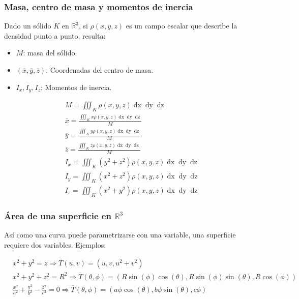\documentclass{article}
\renewcommand{\Bbb}{\mathbb}
\begin{document}
\subsubsection{Masa, centro de masa y momentos de inercia}

Dado un sólido $K$ en $\Bbb R^3$, si $\rho(x,y,z)$ es un campo escalar que describe la densidad punto a punto, resulta:

\begin{itemize}
\item $M$: masa del sólido.
\item $(\overline{x}, \overline{y}, \overline{z})$: Coordenadas del centro de masa.
\item $I_x, I_y, I_z$: Momentos de inercia.
\end{itemize}

\begin{subequations}
\begin{align}
M = \iiint_K \rho(x,y,z) \mathop{dx} \mathop{dy} \mathop{dz} \\
\overline{x} = \frac{ \iiint_K x \rho(x,y,z) \mathop{dx} \mathop{dy} \mathop{dz} }{M} \\
\overline{y} = \frac{ \iiint_K y \rho(x,y,z) \mathop{dx} \mathop{dy} \mathop{dz} }{M} \\
\overline{z} = \frac{ \iiint_K z \rho(x,y,z) \mathop{dx} \mathop{dy} \mathop{dz} }{M} \\
I_x = \iiint_K (y^2 + z^2) \rho(x,y,z) \mathop{dx} \mathop{dy} \mathop{dz} \\
I_y = \iiint_K (x^2 + z^2) \rho(x,y,z) \mathop{dx} \mathop{dy} \mathop{dz} \\
I_z = \iiint_K (x^2 + y^2) \rho(x,y,z) \mathop{dx} \mathop{dy} \mathop{dz}
\end{align}
\end{subequations}

\subsubsection{Área de una superficie en \texorpdfstring{$\Bbb R^3$}{R3}}

Así como una curva puede parametrizarse con una variable, una superficie requiere dos variables. Ejemplos:

\begin{subequations}
\begin{align}
& x^2 + y^2 = z \Rightarrow \overline{T}(u,v) = (u, v, u^2 + v^2) \\
& x^2 + y^2 + z^2 = R^2 \Rightarrow \overline{T}(\theta, \phi) = (R \sin(\phi) \cos(\theta), R \sin(\phi) \sin(\theta), R \cos(\phi)) \label{eq:supesf} \\
& \frac{x^2}{a^2} + \frac{y^2}{b^2} - \frac{z^2}{c^2} = 0 \Rightarrow \overline{T}(\theta, \phi) = (a \phi \cos(\theta), b \phi \sin(\theta), c \phi) \label{eq:supcon}
\end{align}
\end{subequations}
\end{document}
